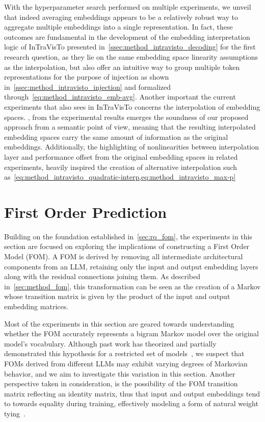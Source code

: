 With the hyperparameter search performed on multiple experiments, we unveil that indeed averaging embeddings appears to be a relatively robust way to aggregate multiple embeddings into a single representation.
In fact, these outcomes are fundamental in the development of the embedding interpretation logic of InTraVisTo presented in~\cref{ssec:method_intravisto_decoding} for the first research question, as they lie on the same embedding space linearity assumptions as the interpolation, but also offer an intuitive way to group multiple token representations for the purpose of injection as shown in~\cref{ssec:method_intravisto_injection} and formalized through~\cref{eq:method_intravisto_emb-avg}.
Another important  the current experiments that also sees  in InTraVisTo concerns the interpolation of embedding spaces.
, from the experimental results emerges the soundness of our proposed approach from a semantic point of view, meaning that the resulting interpolated embedding spaces carry   the same amount of information as the original embeddings.
Additionally, the highlighting of nonlinearities between interpolation layer and performance offset from the original embedding spaces in related experiments, heavily inspired the creation of alternative interpolation  such as~\cref{eq:method_intravisto_quadratic-interp,eq:method_intravisto_max-p}

\section{First Order Prediction}\label{sec:exp_fom}

Building on the foundation established in~\cref{sec:rq_fom}, the experiments in this section are focused on exploring the implications of constructing a First Order Model (FOM).
A FOM is derived by removing all intermediate architectural components from an LLM, retaining only the input and output embedding layers along with the residual connections joining them.
As described in~\cref{sec:method_fom}, this transformation can be seen as the creation of a Markov whose transition matrix is given by the product of the input and output embedding matrices.

Most of the experiments in this section are geared towards understanding whether the FOM accurately represents a bigram Markov model over the original model's vocabulary.
Although past work has theorized and partially demonstrated this hypothesis for a restricted set of models~\cite{elhage2021}, we suspect that FOMs derived from different LLMs may exhibit varying degrees of Markovian behavior, and we aim to investigate this variation in this section.
Another perspective taken in consideration, is the possibility of the FOM transition matrix reflecting an identity matrix, thus  that input and output embeddings tend to  towards equality during training, effectively modeling a form of natural weight tying~\cite{inan2017,press2017}.

